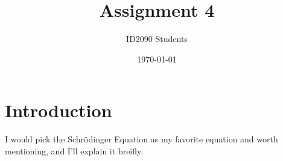 \documentclass[a4paper, 12pt]{article}
\begin{document}
\title{Assignment 4}
\author{ID2090 Students}
\date{\today}
\maketitle

\tableofcontents

\section{Introduction}
I would pick the Schrödinger Equation as my favorite equation and worth mentioning, and I'll explain it breifly.

% 
\end{document}
